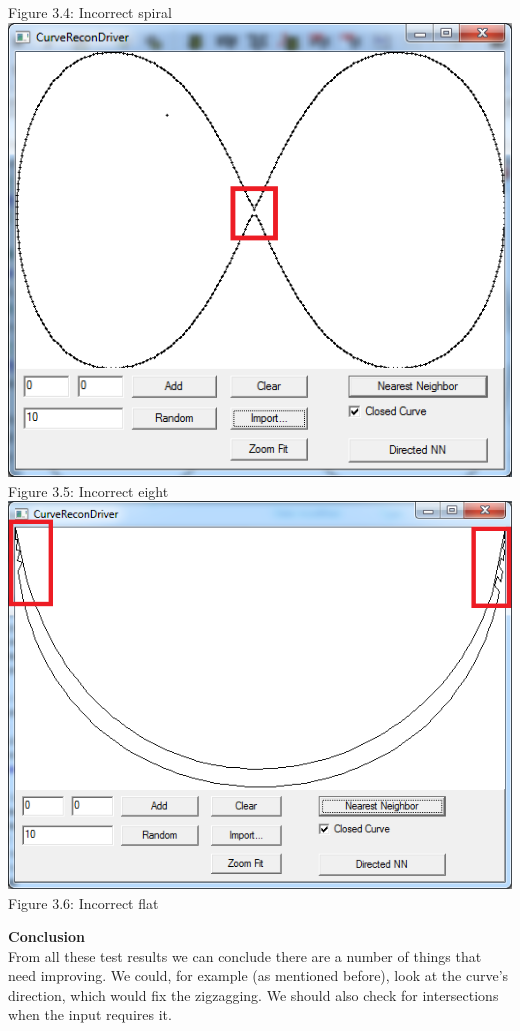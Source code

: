\begin{center}
        \label{fig:nn_incorrectspiral}
        Figure 3.4: Incorrect spiral
        {\ }\\[1.0cm]
        \includegraphics[scale = 0.5]{1NearestNeighbor/nnEightgraph.png}\\
        \label{fig:nn_incorrecteight}
        Figure 3.5: Incorrect eight
        \includegraphics[scale = 0.5]{1NearestNeighbor/nnFlatgraph.png}\\
        \label{fig:nn_incorrectflat}
        Figure 3.6: Incorrect flat
        \end{center}
    \textbf{Conclusion}\\
    From all these test results we can conclude there are a number of things that need improving. We could, for example (as mentioned before), look at the curve's direction, which would fix the zigzagging. We should also check for intersections when the input requires it.

